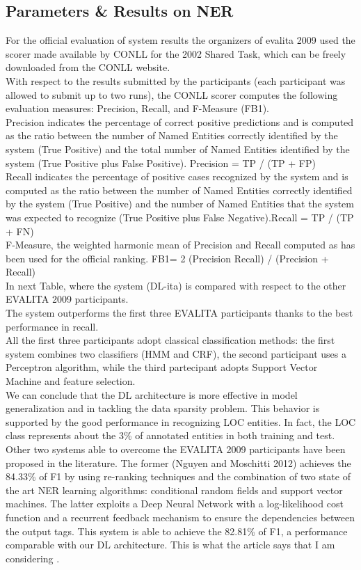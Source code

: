 \documentclass[twocolumn,10pt]{wmrDoc}
\begin{document}
\subsection{Parameters \& Results on NER}
For the official evaluation of system results the organizers of evalita 2009 used the scorer made available
by CONLL for the 2002 Shared Task, which can be freely downloaded from the
CONLL website.\\
With respect to the results submitted by the participants (each participant was allowed to submit up to two runs), the CONLL scorer computes the following evaluation measures: Precision, Recall, and F-Measure (FB1).\\
Precision indicates the percentage of correct positive predictions and is computed as the ratio between the number of Named Entities correctly identified by the system (True Positive) and the total number of Named Entities identified by the system (True
Positive plus False Positive).
Precision = TP / (TP + FP)\\
Recall indicates the percentage of positive cases recognized by the system and is computed as the ratio between the number of Named Entities correctly identified by the system (True Positive) and the number of Named Entities that the system was
expected to recognize (True Positive plus False Negative).Recall = TP / (TP + FN)\\
F-Measure, the weighted harmonic mean of Precision and Recall computed as has been used for the official ranking.
FB1= 2 (Precision  Recall) / (Precision + Recall)\\
In next Table, where the system (DL-ita) is compared with respect to the other EVALITA 2009 participants.\\
The system outperforms the first three EVALITA participants thanks to the best performance in recall.\\
All the first three participants adopt classical classification methods: the first system combines two classifiers (HMM and CRF), the second participant uses a Perceptron algorithm, while the third partecipant adopts Support Vector Machine and feature selection.\\
We can conclude that the DL architecture is more effective in model generalization and in tackling the data sparsity problem. This behavior is supported by the good performance in recognizing LOC entities.
In fact, the LOC class represents about the 3\% of annotated entities in both training and test.
Other two systems able to overcome the EVALITA 2009 participants have been proposed in the
literature. 
The former (Nguyen and Moschitti 2012) achieves the 84.33\% of F1 by using re-ranking techniques and the combination of two state of the art NER learning algorithms: conditional random fields and support vector machines. 
The latter exploits a Deep Neural Network with a log-likelihood cost function and a recurrent feedback mechanism to ensure the dependencies between the output tags. This system is able to achieve the 82.81\% of F1, a performance comparable with our DL architecture.
This is what the article says that I am considering \cite{DBLP:conf/clic-it/BasileSC17}.
\end{document}
